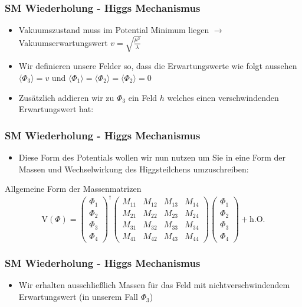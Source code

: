 \documentclass[xcolor=dvipsnames]{beamer}
\begin{document}
\begin{frame}[t]
\frametitle{SM Wiederholung - Higgs Mechanismus }
\begin{itemize}
\item Vakuumszustand muss im  Potential Minimum liegen $\rightarrow$ Vakuumserwartungswert $v=\sqrt{\frac{\mu^2}{\lambda}}$
 \item Wir definieren unsere Felder so, dass die Erwartungswerte wie folgt aussehen $\langle \Phi_{3}\rangle=v$ und  $\langle \Phi_{1}\rangle=\langle \Phi_{2}\rangle=\langle \Phi_{2}\rangle=0$ 
 \item Zusätzlich addieren wir zu $\Phi_{3}$ ein Feld $h$ welches einen verschwindenden Erwartungswert hat:
 \end{itemize}
\end{frame}

\begin{frame}[t]
\frametitle{SM Wiederholung - Higgs Mechanismus }
\begin{itemize}
\item Diese Form des Potentials wollen wir nun nutzen um Sie in eine Form der Massen und Wechselwirkung des Higgsteilchens umzuschreiben:
\end{itemize}
\begin{block}{Allgemeine Form der Massenmatrizen}
\begin{equation*}
\text{V}(\Phi)=\left( \begin{array}{c} \Phi_{1}\\ \Phi_{2} \\ \Phi_{3} \\ \Phi_{4} \end{array}\right)^{\dagger}  \begin{pmatrix} M_{11}&M_{12}&M_{13}&M_{14}\\M_{21}&M_{22}&M_{23}&M_{24} \\ M_{31}&M_{32}&M_{33}&M_{34}\\ M_{41}&M_{42}&M_{43}&M_{44}\end{pmatrix}\left( \begin{array}{c} \Phi_{1}\\ \Phi_{2} \\ \Phi_{3} \\ \Phi_{4} \end{array}\right) + \text{h.O.}
\end{equation*}
\end{block}
\end{frame} 

\begin{frame}[t]
\frametitle{SM Wiederholung - Higgs Mechanismus }
\begin{itemize}
\item Wir erhalten ausschließlich Massen für das Feld mit nichtverschwindendem Erwartungswert (in unserem Fall $\Phi_{3}$)
\end{itemize}




\end{frame}
\end{document}
